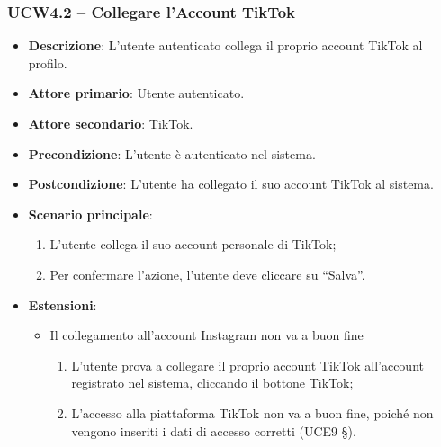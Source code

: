 \subsubsection{UCW4.2 – Collegare l'Account TikTok}
\begin{itemize}
\item \textbf{Descrizione}: L'utente autenticato collega il proprio account TikTok al profilo.
\item \textbf{Attore primario}: Utente autenticato.
\item \textbf{Attore secondario}: TikTok.
\item \textbf{Precondizione}: L’utente è autenticato nel sistema.
\item \textbf{Postcondizione}: L’utente ha collegato il suo account TikTok al sistema.

\item \textbf{Scenario principale}:
\begin{enumerate}
\item L’utente collega il suo account personale di TikTok;
\item Per confermare l’azione, l’utente deve cliccare su “Salva”. 
\end{enumerate}

\item \textbf{Estensioni}:
\begin{itemize}
\item Il collegamento all’account Instagram non va a buon fine
\begin{enumerate}
	\item L’utente prova a collegare il proprio account TikTok all’account registrato nel sistema, cliccando il bottone TikTok;
	\item L’accesso alla piattaforma TikTok non va a buon fine, poiché non vengono inseriti i dati di accesso corretti (UCE9 §).
\end{enumerate}
\end{itemize}
\end{itemize}

